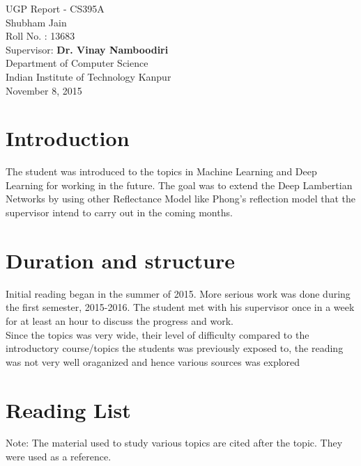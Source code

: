 \documentclass{article}
\begin{document}
\thispagestyle{empty}
\begin{center}
\Large{UGP Report - CS395A}
\\\vspace*{1cm}\large{Shubham Jain}
\\Roll No. : 13683
\\\vspace*{0.5cm} Supervisor: \textbf{Dr. Vinay Namboodiri}
\\\vspace*{0.5cm}Department of Computer Science
\\Indian Institute of Technology Kanpur
\\\vspace*{1cm}\large{November 8, 2015}
\end{center}
\newpage


\newpage


\section{Introduction}
The student was introduced to the topics in Machine Learning and Deep Learning for working in the future. The goal was to extend the Deep Lambertian Networks by using other Reflectance Model like Phong's reflection model that the supervisor intend to carry out in the coming months.

\section{Duration and structure}
Initial reading began in the summer of 2015. More serious work was done during the first semester, 2015-2016. The student met with his supervisor once in a week for at least an hour to discuss the progress and work.
\\Since the topics was very wide, their level of difficulty   compared to the introductory course/topics the students was previously exposed to, the reading was not very well oraganized and hence various sources was explored

\section{Reading List}
Note: The material used to study various topics are cited after the topic. They were used as a reference.
\end{document}
